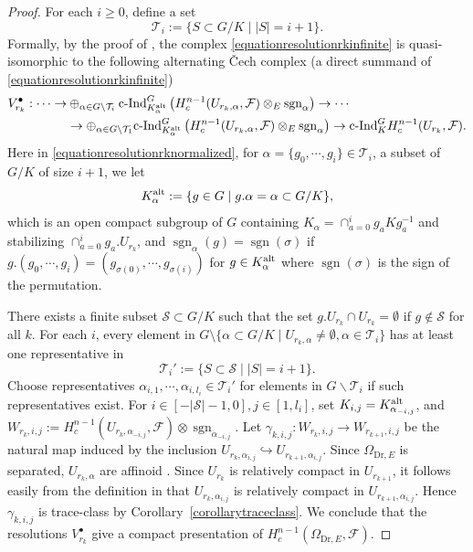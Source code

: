 \documentclass[a4paper,10pt]{amsart}
\theoremstyle{remark}
\theoremstyle{definition}
\theoremstyle{plain}
\numberwithin{equation}{section}
\newcommand{\calF}{{\mathcal F}}
\newcommand{\calS}{{\mathcal S}}
\newcommand{\calT}{{\mathcal T}}
\newcommand{\cInd}{\mathrm{c\text{-}Ind}}
\DeclareMathOperator{\sgn}{sgn}
\begin{document}
\begin{proof}
	For each $i\geq 0$, define a set
	\[\calT_i:=\{S\subset G/K\mid |S|=i+1\}.\]
	Formally, by the proof of \cite[\S3, Prop.~2]{SerreFAC}, the complex \eqref{equationresolutionrkinfinite} is quasi-isomorphic to the following alternating \v{C}ech complex (a direct summand of \eqref{equationresolutionrkinfinite})
	\begin{equation}
		\begin{aligned}\label{equationresolutionrknormalized}
			V_{r_k}^{\bullet}:\cdots\rightarrow &\oplus_{\alpha\in G\backslash \calT_i}\cInd_{K_{\alpha}^{\rm alt}}^G\left( H_c^{n-1}(U_{r_k,\alpha},\calF)\otimes_E\mathrm{sgn}_{\alpha}\right)\rightarrow\cdots \\
			&\rightarrow \oplus_{\alpha\in G\backslash\calT_1}\cInd_{K_{\alpha}^{\rm alt}}^G \left(H_c^{n-1}(U_{r_k,\alpha},\calF)\otimes_E\mathrm{sgn}_{\alpha}\right)\rightarrow \cInd_{K}^G H_c^{n-1}(U_{r_k},\calF).
			\end{aligned}	
	\end{equation}
	Here in \eqref{equationresolutionrknormalized}, for $\alpha=\{g_0,\cdots,g_{i}\}\in \calT_i$, a subset of $G/K$ of size $i+1$, we let \[K_{\alpha}^{\rm alt}:=\{g\in G\mid g.\alpha=\alpha\subset G/K\},\] 
	which is an open compact subgroup of $G$ containing $K_{\alpha}=\cap_{a=0}^{i}g_aKg_a^{-1}$ and stabilizing $\cap_{a=0}^{i}g_a.U_{r_k}$, and $\sgn_{\alpha}(g)=\sgn(\sigma)$ if $g.(g_0,\cdots,g_i)=(g_{\sigma(0)},\cdots,g_{\sigma(i)})$ for $g\in K_{\alpha}^{\rm alt}$ where $\sgn(\sigma)$ is the sign of the permutation. 
	
	There exists a finite subset $\calS\subset G/K$ such that the set $g.U_{r_k}\cap U_{r_k}=\emptyset$ if $ g\notin \calS$ for all $k$. For each $i$, every element in $G\setminus\{\alpha\subset G/K\mid U_{r_k,\alpha}\neq \emptyset,\alpha\in\calT_i\}$ has at least one representative in 
	\[\calT_i':=\{S\subset \calS\mid |S|=i+1\}.\]
	Choose representatives $\alpha_{i,1},\cdots,\alpha_{i,l_i}\in \calT_i'$ for elements in $G\backslash \calT_i$ if such representatives exist. For $i\in [-|\calS|-1,0],j\in[1,l_i]$, set $K_{i,j}=K_{\alpha_{-i,j}}^{\rm alt}$, and $W_{r_k,i,j}:=H_c^{n-1}(U_{r_k,\alpha_{-i,j}},\calF)\otimes\sgn_{\alpha_{-i,j}}$. Let $\gamma_{k,i,j}:W_{r_k,i,j}\rightarrow W_{r_{k+1},i,j}$ be the natural map induced by the inclusion $U_{r_k,\alpha_{i,j}}\hookrightarrow U_{r_{k+1},\alpha_{i,j}}$. Since $\Omega_{\mathrm{Dr},E}$ is separated, $U_{r_k,\alpha}$ are affinoid \cite[\S~9.6.1, Prop.~6]{BGR84}. Since $U_{r_k}$ is relatively compact in $U_{r_{k+1}}$, it follows easily from the definition in \cite[\S~9.6.2]{BGR84} that $U_{r_k,\alpha_{i,j}}$ is relatively compact in $U_{r_{k+1},\alpha_{i,j}}$. Hence $\gamma_{k,i,j}$ is trace-class by Corollary~\ref{corollarytraceclass}. We conclude that the resolutions $V_{r_k}^{\bullet}$ give a compact presentation of $H_c^{n-1}(\Omega_{\mathrm{Dr},E},\calF)$.
\end{proof}
\end{document}
